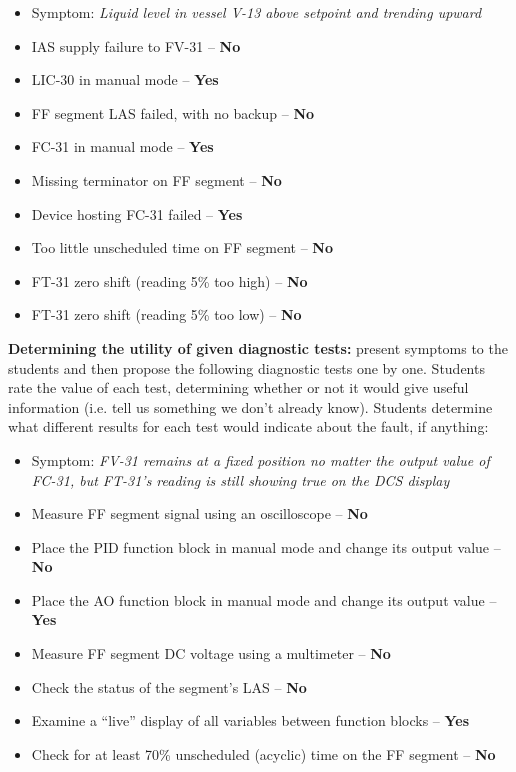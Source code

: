 \begin{itemize}
\item{} Symptom: {\it Liquid level in vessel V-13 above setpoint and trending upward}
\item{} IAS supply failure to FV-31 -- {\bf No}
\item{} LIC-30 in manual mode -- {\bf Yes}
\item{} FF segment LAS failed, with no backup -- {\bf No}
\item{} FC-31 in manual mode -- {\bf Yes}
\item{} Missing terminator on FF segment -- {\bf No}
\item{} Device hosting FC-31 failed -- {\bf Yes}
\item{} Too little unscheduled time on FF segment -- {\bf No}
\item{} FT-31 zero shift (reading 5\% too high) -- {\bf No}
\item{} FT-31 zero shift (reading 5\% too low) -- {\bf No}
\end{itemize}


\vskip 10pt


\noindent
{\bf Determining the utility of given diagnostic tests:} present symptoms to the students and then propose the following diagnostic tests one by one.  Students rate the value of each test, determining whether or not it would give useful information (i.e. tell us something we don't already know).  Students determine what different results for each test would indicate about the fault, if anything:

\begin{itemize}
\item{} Symptom: {\it FV-31 remains at a fixed position no matter the output value of FC-31, but FT-31's reading is still showing true on the DCS display}
\item{} Measure FF segment signal using an oscilloscope -- {\bf No}
\item{} Place the PID function block in manual mode and change its output value -- {\bf No}
\item{} Place the AO function block in manual mode and change its output value -- {\bf Yes}
\item{} Measure FF segment DC voltage using a multimeter -- {\bf No}
\item{} Check the status of the segment's LAS -- {\bf No}
\item{} Examine a ``live'' display of all variables between function blocks -- {\bf Yes}
\item{} Check for at least 70\% unscheduled (acyclic) time on the FF segment -- {\bf No}
\end{itemize}


